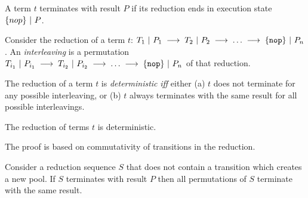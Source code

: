 \begin{definition}[Termination]
A term $t$ terminates with result $P$ if its reduction ends in execution state $\{nop\}~|~P$.
\end{definition}

\begin{definition}[Interleaving]
Consider the reduction of a term $t$: $T_1~|~P_1 \;\longrightarrow\; T_2~|~P_2 \;\longrightarrow\; \ldots \;\longrightarrow\; \{\texttt{nop}\}~|~P_n$. An \emph{interleaving} is a permutation 
$T_{i_1}~|~P_{i_1} \;\longrightarrow\; T_{i_2}~|~P_{i_2} \;\longrightarrow\; \ldots \;\longrightarrow\; \{\texttt{nop}\}~|~P_n$ of that reduction.
\end{definition}

\begin{definition}[Determinism]
The reduction of a term $t$ is \emph{deterministic} \emph{iff} either (a) $t$ does not terminate for any possible interleaving, or (b) $t$ always terminates with the same result for all possible interleavings.
\end{definition}

\begin{theorem}
The reduction of terms $t$ is deterministic.
\end{theorem}

The proof is based on commutativity of transitions in the reduction.

\begin{lemma}
Consider a reduction sequence $S$ that does not contain a transition which creates a new pool.
If $S$ terminates with result $P$ then all permutations of $S$ terminate with the same result.
\end{lemma}
